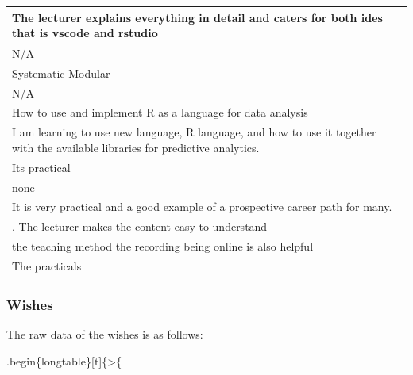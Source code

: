 \documentclass[
]{article}
\begin{document}
\begin{longtable}[t]{>{\raggedright\arraybackslash}p{35em}}
\hline
The lecturer explains everything in detail and caters for both ides that is vscode and rstudio\\
\hline
N/A\\
\hline
Systematic  Modular\\
\hline
N/A \\
\hline
How to use and implement R as a language for data analysis\\
\hline
I am learning to use new language, R language, and how to use it together with the available libraries for predictive analytics.   \\
\hline
Its practical \\
\hline
none\\
\hline
It is very practical and a good example of a prospective career path for many.\\
\hline
1. The lecturer makes the content easy to understand\\
\hline
the teaching method  the recording being online is also helpful \\
\hline
The practicals\\
\bottomrule
\end{longtable}

\newpage

\subsubsection{Wishes}\label{wishes}

The raw data of the wishes is as follows:

.begin\{longtable\}{[}t{]}\{\textgreater\{

\raggedright
\end{document}
